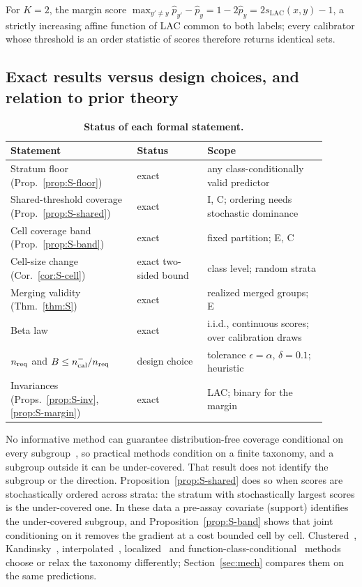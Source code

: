 \documentclass[10pt]{article}
\begin{document}
\begin{proposition}\label{prop:S-margin}
For $K=2$, the margin score $\max_{y'\neq y}\hat p_{y'}-\hat p_y=1-2\hat p_y=2s_{\mathrm{LAC}}(x,y)-1$, a strictly increasing affine function of LAC common to both labels; every calibrator whose threshold is an order statistic of scores therefore returns identical sets.
\end{proposition}

\subsection{Exact results versus design choices, and relation to prior theory}
\begin{table}[!htbp]\centering\small
\caption{\textbf{Status of each formal statement.}}\label{tab:exact}
\begin{tabular}{p{0.36\linewidth}p{0.2\linewidth}p{0.34\linewidth}}\toprule
Statement & Status & Scope\\\midrule
Stratum floor (Prop.~\ref{prop:S-floor}) & exact & any class-conditionally valid predictor\\
Shared-threshold coverage (Prop.~\ref{prop:S-shared}) & exact & I, C; ordering needs stochastic dominance\\
Cell coverage band (Prop.~\ref{prop:S-band}) & exact & fixed partition; E, C\\
Cell-size change (Cor.~\ref{cor:S-cell}) & exact two-sided bound & class level; random strata\\
Merging validity (Thm.~\ref{thm:S}) & exact & realized merged groups; E\\
Beta law & exact~\cite{vovk2012conditional} & i.i.d., continuous scores; over calibration draws\\
$n_{\mathrm{req}}$ and $B\le n^{-}_{\mathrm{cal}}/n_{\mathrm{req}}$ & design choice & tolerance $\epsilon=\alpha$, $\delta=0.1$; heuristic\\
Invariances (Props.~\ref{prop:S-inv}, \ref{prop:S-margin}) & exact & LAC; binary for the margin\\\bottomrule
\end{tabular}\end{table}
No informative method can guarantee distribution-free coverage conditional on every subgroup~\cite{barber2021limits}, so practical methods condition on a finite taxonomy, and a subgroup outside it can be under-covered. That result does not identify the subgroup or the direction. Proposition~\ref{prop:S-shared} does so when scores are stochastically ordered across strata: the stratum with stochastically largest scores is the under-covered one. In these data a pre-assay covariate (support) identifies the under-covered subgroup, and Proposition~\ref{prop:S-band} shows that joint conditioning on it removes the gradient at a cost bounded cell by cell. Clustered~\cite{ding2023clustered}, Kandinsky~\cite{bairaktari2025kandinsky}, interpolated~\cite{ding2026longtail}, localized~\cite{guan2023lcp,hore2025rlcp} and function-class-conditional~\cite{gibbs2025conditional} methods choose or relax the taxonomy differently; Section~\ref{sec:mech} compares them on the same predictions.
\end{document}
